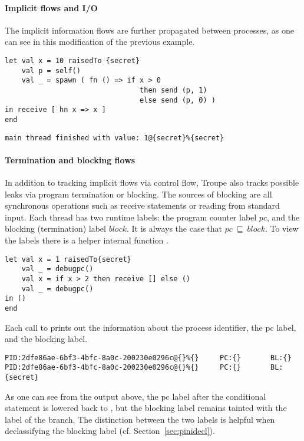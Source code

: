 \paragraph{Implicit flows and I/O}
The implicit information flows are further propagated between processes,
as one can see in this modification of the previous example.

\begin{lstlisting}
let val x = 10 raisedTo {secret}
    val p = self()
    val _ = spawn ( fn () => if x > 0 
    							then send (p, 1) 
    							else send (p, 0) )
in receive [ hn x => x ]
end
\end{lstlisting}
\begin{verbatim}
main thread finished with value: 1@{secret}%{secret}
\end{verbatim}


\paragraph{Termination and blocking flows} 
In addition to tracking implicit flows via control flow, Troupe also 
tracks possible leaks via program termination or blocking.
The sources of blocking are all synchronous operations such as receive statements or reading from standard input. 
Each thread has two runtime labels: the program counter label $\mathit{pc}$, and 
the blocking (termination) label $\mathit{block}$. It is always the case that 
$\mathit{pc}~\sqsubseteq~\mathit{block}$. To view the labels there is a 
helper internal function .
\begin{lstlisting}
let val x = 1 raisedTo{secret}
    val _ = debugpc() 
    val x = if x > 2 then receive [] else () 
    val _ = debugpc() 
in () 
end    
\end{lstlisting}

Each call to  prints out the information about the process identifier,
the pc label, and the blocking label.
\begin{verbatim}
PID:2dfe86ae-6bf3-4bfc-8a0c-200230e0296c@{}%{}     PC:{}       BL:{}                
PID:2dfe86ae-6bf3-4bfc-8a0c-200230e0296c@{}%{}     PC:{}       BL:{secret}           
\end{verbatim}
As one can see from the output above, the pc label after the conditional
statement is lowered back to \lev{}, but the blocking label remains tainted 
with the label of the branch. The distinction between the two labels
is helpful when declassifying the blocking label (cf. Section~\ref{sec:pinidecl}).





